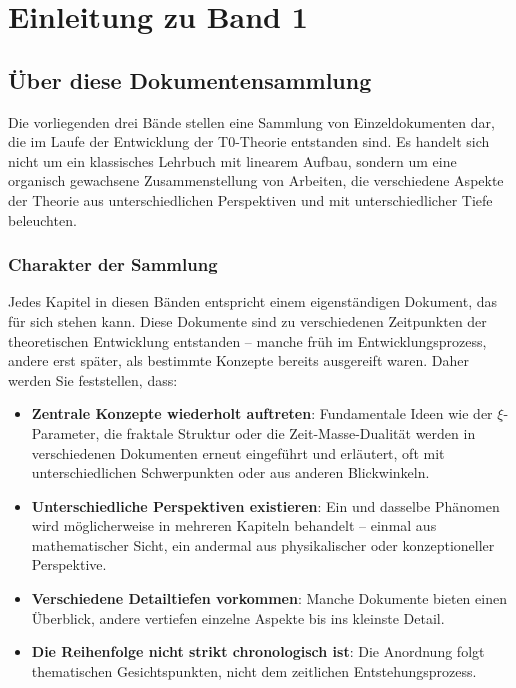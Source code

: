 
\chapter*{Einleitung zu Band 1}

\section*{Über diese Dokumentensammlung}

Die vorliegenden drei Bände stellen eine Sammlung von Einzeldokumenten dar, die im Laufe der Entwicklung der T0-Theorie entstanden sind. Es handelt sich nicht um ein klassisches Lehrbuch mit linearem Aufbau, sondern um eine organisch gewachsene Zusammenstellung von Arbeiten, die verschiedene Aspekte der Theorie aus unterschiedlichen Perspektiven und mit unterschiedlicher Tiefe beleuchten.

\subsection*{Charakter der Sammlung}

Jedes Kapitel in diesen Bänden entspricht einem eigenständigen Dokument, das für sich stehen kann. Diese Dokumente sind zu verschiedenen Zeitpunkten der theoretischen Entwicklung entstanden -- manche früh im Entwicklungsprozess, andere erst später, als bestimmte Konzepte bereits ausgereift waren. Daher werden Sie feststellen, dass:

\begin{itemize}
\item \textbf{Zentrale Konzepte wiederholt auftreten}: Fundamentale Ideen wie der $\xi$-Parameter, die fraktale Struktur oder die Zeit-Masse-Dualität werden in verschiedenen Dokumenten erneut eingeführt und erläutert, oft mit unterschiedlichen Schwerpunkten oder aus anderen Blickwinkeln.

\item \textbf{Unterschiedliche Perspektiven existieren}: Ein und dasselbe Phänomen wird möglicherweise in mehreren Kapiteln behandelt -- einmal aus mathematischer Sicht, ein andermal aus physikalischer oder konzeptioneller Perspektive.

\item \textbf{Verschiedene Detailtiefen vorkommen}: Manche Dokumente bieten einen Überblick, andere vertiefen einzelne Aspekte bis ins kleinste Detail.

\item \textbf{Die Reihenfolge nicht strikt chronologisch ist}: Die Anordnung folgt thematischen Gesichtspunkten, nicht dem zeitlichen Entstehungsprozess.
\end{itemize}

